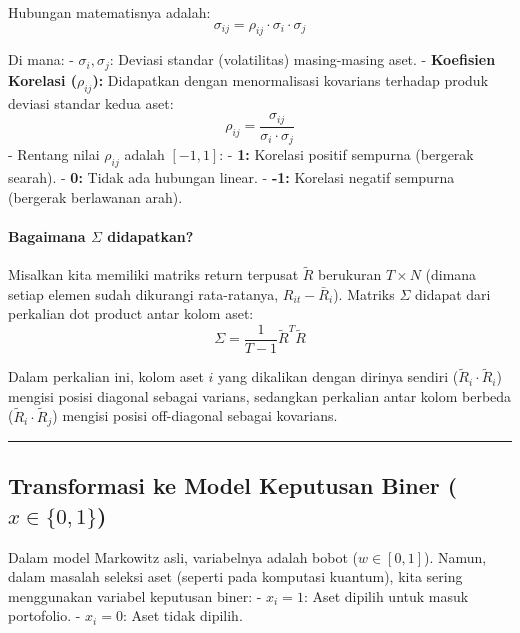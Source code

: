 Hubungan matematisnya adalah: \[ \sigma_{ij} = \rho_{ij} \cdot \sigma_i \cdot \sigma_j \]

Di mana: - \(\sigma_i, \sigma_j\): Deviasi standar (volatilitas) masing-masing aset. - \textbf{Koefisien Korelasi (\(\rho_{ij}\)):} Didapatkan dengan menormalisasi kovarians terhadap produk deviasi standar kedua aset: \[ \rho_{ij} = \frac{\sigma_{ij}}{\sigma_i \cdot \sigma_j} \] - Rentang nilai \(\rho_{ij}\) adalah \([-1, 1]\): - \textbf{1:} Korelasi positif sempurna (bergerak searah). - \textbf{0:} Tidak ada hubungan linear. - \textbf{-1:} Korelasi negatif sempurna (bergerak berlawanan arah).

\hypertarget{bagaimana-sigma-didapatkan}{%
\paragraph{\texorpdfstring{Bagaimana \(\Sigma\) didapatkan?}{Bagaimana \textbackslash Sigma didapatkan?}}\label{bagaimana-sigma-didapatkan}}

Misalkan kita memiliki matriks return terpusat \(\tilde{R}\) berukuran \(T \times N\) (dimana setiap elemen sudah dikurangi rata-ratanya, \(R_{it} - \bar{R}_i\)). Matriks \(\Sigma\) didapat dari perkalian dot product antar kolom aset: \[ \Sigma = \frac{1}{T-1} \tilde{R}^T \tilde{R} \]

Dalam perkalian ini, kolom aset \(i\) yang dikalikan dengan dirinya sendiri (\(\tilde{R}_i \cdot \tilde{R}_i\)) mengisi posisi diagonal sebagai varians, sedangkan perkalian antar kolom berbeda (\(\tilde{R}_i \cdot \tilde{R}_j\)) mengisi posisi off-diagonal sebagai kovarians.

\begin{center}\rule{0.5\linewidth}{0.5pt}\end{center}

\hypertarget{transformasi-ke-model-keputusan-biner-x-in-01}{%
\subsection{\texorpdfstring{Transformasi ke Model Keputusan Biner (\(x \in \{0,1\}\))}{Transformasi ke Model Keputusan Biner (x \textbackslash in \textbackslash\{0,1\textbackslash\})}}\label{transformasi-ke-model-keputusan-biner-x-in-01}}

Dalam model Markowitz asli, variabelnya adalah bobot (\(w \in [0,1]\)). Namun, dalam masalah seleksi aset (seperti pada komputasi kuantum), kita sering menggunakan variabel keputusan biner: - \(x_i = 1\): Aset dipilih untuk masuk portofolio. - \(x_i = 0\): Aset tidak dipilih.

